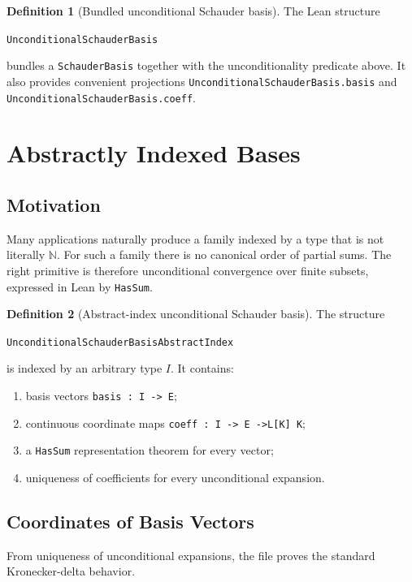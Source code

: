 \documentclass[12pt,a4paper]{article}
\theoremstyle{definition}
\newtheorem{definition}{Definition}[section]
\newcommand{\Nat}{\mathbb{N}}
\begin{document}
\begin{definition}[Bundled unconditional Schauder basis]
The Lean structure
\begin{center}
\verb|UnconditionalSchauderBasis|
\end{center}
bundles a \verb|SchauderBasis| together with the unconditionality predicate
above.  It also provides convenient projections
\verb|UnconditionalSchauderBasis.basis| and
\verb|UnconditionalSchauderBasis.coeff|.
\end{definition}

\newpage

\section{Abstractly Indexed Bases}

\subsection{Motivation}

Many applications naturally produce a family indexed by a type that is not
literally $\Nat$.  For such a family there is no canonical order of partial
sums.  The right primitive is therefore unconditional convergence over finite
subsets, expressed in Lean by \verb|HasSum|.

\begin{definition}[Abstract-index unconditional Schauder basis]
The structure
\begin{center}
\verb|UnconditionalSchauderBasisAbstractIndex|
\end{center}
is indexed by an arbitrary type $I$.  It contains:
\begin{enumerate}[label=(\roman*)]
  \item basis vectors \verb|basis : I -> E|;
  \item continuous coordinate maps \verb|coeff : I -> E ->L[K] K|;
  \item a \verb|HasSum| representation theorem for every vector;
  \item uniqueness of coefficients for every unconditional expansion.
\end{enumerate}
\end{definition}

\subsection{Coordinates of Basis Vectors}

From uniqueness of unconditional expansions, the file proves the standard
Kronecker-delta behavior.
\end{document}
